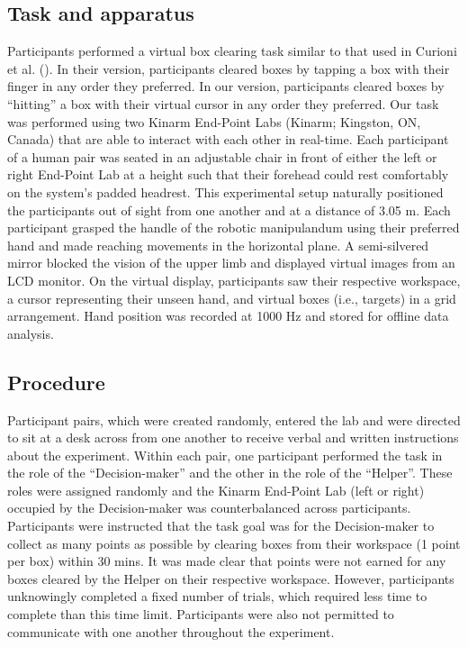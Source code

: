 \documentclass[
  man,
  floatsintext,
  longtable,
  nolmodern,
  notxfonts,
  notimes,
  mask,
  colorlinks=true,linkcolor=blue,citecolor=blue,urlcolor=blue]{apa7}
\begin{document}
\subsection{Task and apparatus}\label{task-and-apparatus}

Participants performed a virtual box clearing task similar to that used
in Curioni et al. (). In their version,
participants cleared boxes by tapping a box with their finger in any
order they preferred. In our version, participants cleared boxes by
``hitting'' a box with their virtual cursor in any order they preferred.
Our task was performed using two Kinarm End-Point Labs (Kinarm;
Kingston, ON, Canada) that are able to interact with each other in
real-time. Each participant of a human pair was seated in an adjustable
chair in front of either the left or right End-Point Lab at a height
such that their forehead could rest comfortably on the system's padded
headrest. This experimental setup naturally positioned the participants
out of sight from one another and at a distance of 3.05 m. Each
participant grasped the handle of the robotic manipulandum using their
preferred hand and made reaching movements in the horizontal plane. A
semi-silvered mirror blocked the vision of the upper limb and displayed
virtual images from an LCD monitor. On the virtual display, participants
saw their respective workspace, a cursor representing their unseen hand,
and virtual boxes (i.e., targets) in a grid arrangement. Hand position
was recorded at 1000 Hz and stored for offline data analysis.

\subsection{Procedure}\label{procedure}

Participant pairs, which were created randomly, entered the lab and were
directed to sit at a desk across from one another to receive verbal and
written instructions about the experiment. Within each pair, one
participant performed the task in the role of the ``Decision-maker'' and
the other in the role of the ``Helper''. These roles were assigned
randomly and the Kinarm End-Point Lab (left or right) occupied by the
Decision-maker was counterbalanced across participants. Participants
were instructed that the task goal was for the Decision-maker to collect
as many points as possible by clearing boxes from their workspace (1
point per box) within 30 mins. It was made clear that points were not
earned for any boxes cleared by the Helper on their respective
workspace. However, participants unknowingly completed a fixed number of
trials, which required less time to complete than this time limit.
Participants were also not permitted to communicate with one another
throughout the experiment.
\end{document}
